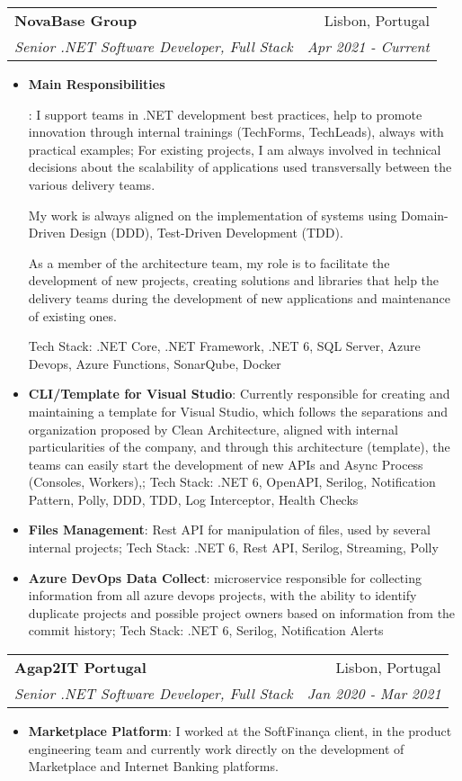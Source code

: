 \documentclass[letterpaper,11pt]{article}
\makeatletter
\newcommand{\resumeItem}[2]{
  \item\small{
    \textbf{#1}{: #2 \vspace{-2pt}}
  }
}
\newcommand{\resumeSubheading}[4]{
  \vspace{-1pt}\item
    \begin{tabular*}{0.97\textwidth}[t]{l@{\extracolsep{\fill}}r}
      \textbf{#1} & #2 \\
      \textit{\small#3} & \textit{\small #4} \\
    \end{tabular*}\vspace{-5pt}
}
\newcommand{\resumeItemListStart}{\begin{itemize}}
\newcommand{\resumeItemListEnd}{\end{itemize}\vspace{-5pt}}
\makeatother
\begin{document}
    \resumeSubheading
    {NovaBase Group}{Lisbon, Portugal}
    {Senior .NET Software Developer, Full Stack}{Apr 2021 - Current}
    \resumeItemListStart
      \resumeItem{Main Responsibilities}
        {I support teams in .NET development best practices, help to promote innovation through internal trainings (TechForms, TechLeads), always with practical examples; For existing projects, I am always involved in technical decisions about the scalability of applications used transversally between the various delivery teams.
        
        My work is always aligned on the implementation of systems using Domain-Driven Design (DDD), Test-Driven Development (TDD).
        
        As a member of the architecture team, my role is to facilitate the development of new projects, creating solutions and libraries that help the delivery teams during the development of new applications and maintenance of existing ones.
        
        Tech Stack: .NET Core, .NET Framework, .NET 6, SQL Server, Azure Devops, Azure Functions, SonarQube, Docker}
    
        \resumeItem{CLI/Template for Visual Studio}
        {Currently responsible for creating and maintaining a template for Visual Studio, which follows the separations and organization proposed by Clean Architecture, aligned with internal particularities of the company, and through this architecture (template), the teams can easily start the development of new APIs and Async Process (Consoles, Workers),;
        Tech Stack: .NET 6, OpenAPI, Serilog, Notification Pattern, Polly, DDD, TDD, Log Interceptor, Health Checks }
        \resumeItem{Files Management}
        {Rest API for manipulation of files, used by several internal projects;
        Tech Stack: .NET 6, Rest API, Serilog, Streaming, Polly}
        \resumeItem{Azure DevOps Data Collect}
        {microservice responsible for collecting information from all azure devops projects, with the ability to identify duplicate projects and possible project owners based on information from the commit history;
        Tech Stack: .NET 6, Serilog, Notification Alerts}
        \resumeItemListEnd


    \resumeSubheading
    {Agap2IT Portugal}{Lisbon, Portugal}
    {Senior .NET Software Developer, Full Stack}{Jan 2020 - Mar 2021}
    \resumeItemListStart
      \resumeItem{Marketplace Platform}
        {I worked at the SoftFinança client, in the product engineering team and currently work directly on the development of Marketplace and Internet Banking platforms.}
    \resumeItemListEnd
\end{document}
